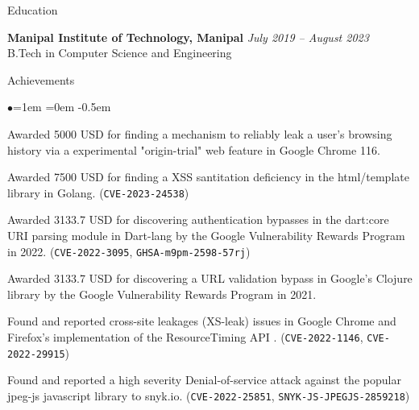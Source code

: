 \documentclass{resume} %
\date{\today}
\begin{document}
\begin{rSection}{Education}

{\bf Manipal Institute of Technology, Manipal} \hfill {\em July 2019 -- August 2023}  \\ B.Tech in Computer Science and Engineering\hfill
\end{rSection}
\begin{rSection}{Achievements}
\begin{list}{$\bullet$}{\leftmargin=1em \itemindent=0em}
\itemsep -0.5em
\item Awarded 5000 USD for finding a mechanism to reliably leak a user's browsing history via a experimental "origin-trial" web feature in Google Chrome 116.
\item Awarded 7500 USD for finding a XSS santitation deficiency in the html/template library in Golang. (\texttt{CVE-2023-24538})
\item Awarded 3133.7 USD for discovering authentication bypasses in the dart:core URI parsing module in Dart-lang by the Google Vulnerability Rewards Program in 2022. (\texttt{CVE-2022-3095}, \texttt{GHSA-m9pm-2598-57rj})
\item Awarded 3133.7 USD for discovering a URL validation bypass in Google's Clojure library by the Google Vulnerability Rewards Program in 2021.
\item Found and reported cross-site leakages (XS-leak) issues in Google Chrome and Firefox's implementation of the ResourceTiming API . (\texttt{CVE-2022-1146}, \texttt{CVE-2022-29915})
\item Found and reported a high severity Denial-of-service attack against the popular jpeg-js javascript library to snyk.io.
\linebreak(\texttt{CVE-2022-25851}, \texttt{SNYK-JS-JPEGJS-2859218})
\end{list}
\end{rSection}
\end{document}
